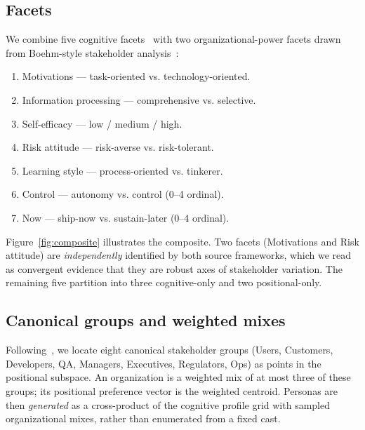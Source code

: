 \documentclass[10pt,conference]{IEEEtran}
\begin{document}

\subsection{Facets}
We combine five cognitive facets~\cite{burnett2016gendermag} with two
organizational-power facets drawn from Boehm-style stakeholder
analysis~\cite{boehm2004valuebased,menzies2009value}:

\begin{enumerate}
  \item \textsf{Motivations} --- task-oriented vs. technology-oriented.
  \item \textsf{Information processing} --- comprehensive vs. selective.
  \item \textsf{Self-efficacy} --- low / medium / high.
  \item \textsf{Risk attitude} --- risk-averse vs. risk-tolerant.
  \item \textsf{Learning style} --- process-oriented vs. tinkerer.
  \item \textsf{Control} --- autonomy vs. control (0--4 ordinal).
  \item \textsf{Now} --- ship-now vs. sustain-later (0--4 ordinal).
\end{enumerate}

Figure~\ref{fig:composite} illustrates the composite. Two facets
(\textsf{Motivations} and \textsf{Risk attitude}) are \emph{independently}
identified by both source frameworks, which we read as convergent evidence
that they are robust axes of stakeholder variation. The remaining five
partition into three cognitive-only and two positional-only.

\subsection{Canonical groups and weighted mixes}
Following~\cite{menzies2009value}, we locate eight canonical stakeholder
groups (Users, Customers, Developers, QA, Managers, Executives, Regulators,
Ops) as points in the positional subspace. An organization is a weighted mix
of at most three of these groups; its positional preference vector is the
weighted centroid. Personas are then \emph{generated} as a cross-product of
the cognitive profile grid with sampled organizational mixes, rather than
enumerated from a fixed cast.

\end{document}

